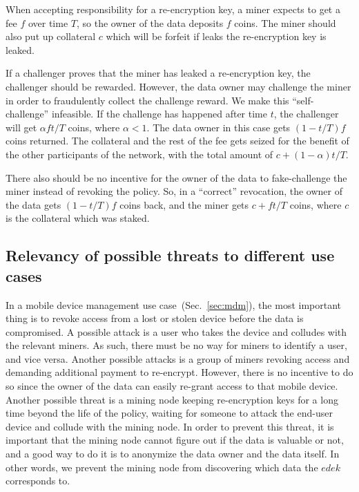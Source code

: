 \documentclass[longbibliography,nofootinbib]{revtex4-1}
\begin{document}
When accepting responsibility for a re-encryption key, a miner expects to get a fee $f$ over time $T$, so the owner of the data deposits $f$ coins.
The miner should also put up collateral $c$ which will be forfeit if leaks the re-encryption key is leaked.

If a challenger proves that the miner has leaked a re-encryption key, the challenger should be rewarded.
However, the data owner may challenge the miner in order to fraudulently collect the challenge reward.
We make this ``self-challenge'' infeasible.
If the challenge has happened after time $t$, the challenger will get
$\alpha f t/T$ coins, where $\alpha < 1$.
The data owner in this case gets $(1 - t/T) f$ coins returned.
The collateral and the rest of the fee gets seized for the benefit of the other participants of the network, with the total amount of $c + (1 - \alpha) t/T$.

There also should be no incentive for the owner of the data to fake-challenge the miner instead of revoking the policy.
So, in a ``correct'' revocation, the owner of the data gets $(1 - t/T) f$ coins back, and the miner gets $c + ft/T$ coins, where $c$ is the collateral which
was staked.


\subsection{Relevancy of possible threats to different use cases}

In a mobile device management use case~(Sec.~\ref{sec:mdm}),
the most important thing is to revoke access from a lost or stolen device before the data is compromised.
A possible attack is a user who takes the device and colludes with the relevant miners.
As such, there must be no way for miners to identify a user, and vice versa.
Another possible attacks is a group of miners revoking access and demanding additional payment to re-encrypt.
However, there is no incentive to do so since the owner of the data can easily re-grant access to that mobile device.
Another possible threat is a mining node keeping re-encryption keys for a long time beyond the life of the policy,
waiting for someone to attack the end-user device and collude with the mining node.
In order to prevent this threat, it is important that the mining node cannot figure out if the data is valuable or not,
and a good way to do it is to anonymize the data owner and the data itself.
In other words, we prevent the mining node from discovering which data the $edek$ corresponds to.
\end{document}
